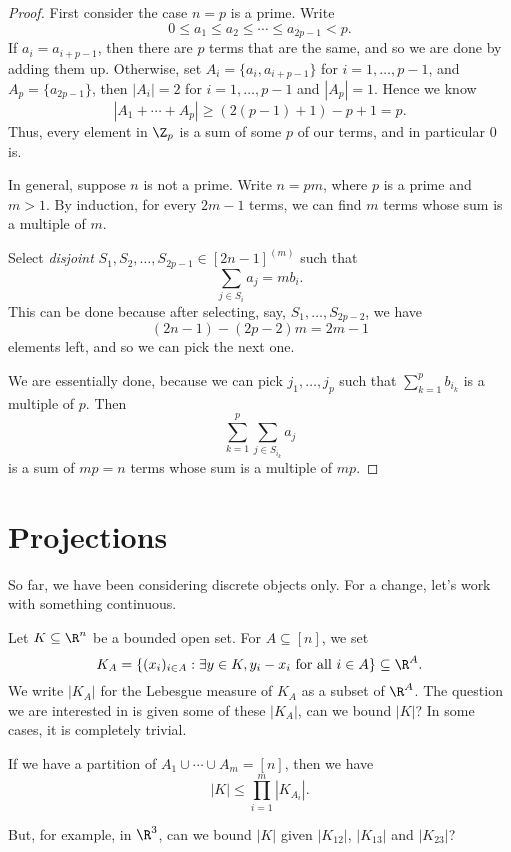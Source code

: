 \documentclass[a4paper]{article}
\begin{document}
\begin{proof}
  First consider the case $n = p$ is a prime. Write
  \[
    0 \leq a_1 \leq a_2 \leq \cdots \leq a_{2p - 1} < p.
  \]
  If $a_i = a_{i + p - 1}$, then there are $p$ terms that are the same, and so we are done by adding them up. Otherwise, set $A_i = \{a_i, a_{i + p - 1}\}$ for $i = 1, \ldots, p - 1$, and $A_p = \{a_{2p - 1}\}$, then $|A_i| = 2$ for $i = 1, \ldots, p - 1$ and $|A_p| = 1$. Hence we know
  \[
    |A_1 + \cdots + A_p| \geq (2(p - 1) + 1) - p + 1 = p.
  \]
  Thus, every element in $\Z_p$ is a sum of some $p$ of our terms, and in particular $0$ is.

  In general, suppose $n$ is not a prime. Write $n = pm$, where $p$ is a prime and $m > 1$. By induction, for every $2m - 1$ terms, we can find $m$ terms whose sum is a multiple of $m$.

  Select \emph{disjoint} $S_1, S_2, \ldots, S_{2p - 1} \in [2n - 1]^{(m)}$ such that
  \[
    \sum_{j \in S_i} a_j = m b_i.
  \]
  This can be done because after selecting, say, $S_1, \ldots, S_{2p - 2}$, we have
  \[
    (2n - 1) - (2p - 2)m = 2m - 1
  \]
  elements left, and so we can pick the next one.

  We are essentially done, because we can pick $j_1, \ldots, j_p$ such that $\sum_{k = 1}^p b_{i_k}$ is a multiple of $p$. Then
  \[
    \sum_{k = 1}^p \sum_{j \in S_{i_k}} a_j
  \]
  is a sum of $mp = n$ terms whose sum is a multiple of $mp$.
\end{proof}

\section{Projections}
So far, we have been considering discrete objects only. For a change, let's work with something continuous.

Let $K \subseteq \R^n$ be a bounded open set. For $A \subseteq [n]$, we set
\[
  K_A = \{(x_i)_{i \in A} : \exists y \in K, y_i - x_i\text{ for all }i \in A\} \subseteq \R^A.
\]
We write $|K_A|$ for the Lebesgue measure of $K_A$ as a subset of $\R^A$. The question we are interested in is given some of these $|K_A|$, can we bound $|K|$? In some cases, it is completely trivial.
\begin{eg}
  If we have a partition of $A_1 \cup \cdots \cup A_m = [n]$, then we have
  \[
    |K| \leq \prod_{i = 1}^m |K_{A_i}|.
  \]
\end{eg}

But, for example, in $\R^3$, can we bound $|K|$ given $|K_{12}|$, $|K_{13}|$ and $|K_{23}|$?
\end{document}
